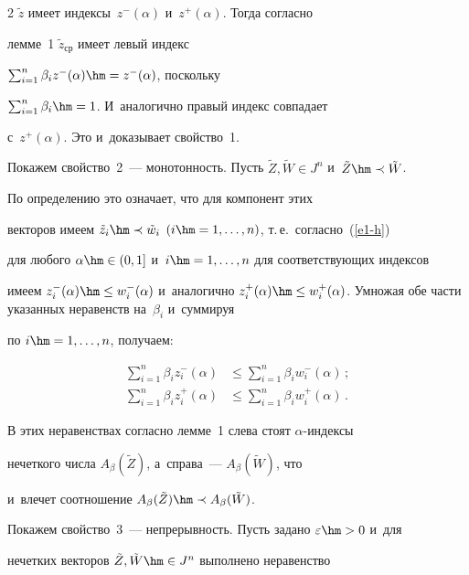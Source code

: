 \begin{multicols}{2}
$\tilde{z}$ имеет индексы~$z^{-}(\alpha)$ и~$z^{+}(\alpha)$. Тогда согласно 


лемме~1 $\tilde{z}_{\mathrm{ср}}$ имеет левый индекс 


$\sum\nolimits_{i=1}^n\beta_iz^{-}(\alpha) \hm= z^{-}(\alpha)$, поскольку 


$\sum\nolimits_{i=1}^n\beta_i\hm  = 1$. И~аналогично правый индекс совпадает 


с~$z^{+}(\alpha)$. Это и~доказывает свойство~1.





Покажем свойство~2~--- монотонность. Пусть $\tilde{Z}, \tilde{W}\in J^n$  и~$\tilde{Z}\hm\prec\tilde{W}$. 


По определению это означает, что для компонент этих 


векторов имеем $\tilde{z}_i\hm\prec\tilde{w}_i$ $(i\hm=1,\ldots,n)$, т.\,е.\ согласно~(\ref{e1-h}) 


для любого $\alpha\hm\in(0, 1]$ и~$i\hm=1,\ldots,n$ для соответствующих индексов 


имеем  $z^{-}_i(\alpha)\hm\leq w^{-}_i(\alpha)$ и~аналогично $z^{+}_i(\alpha)\hm\leq 


w^{+}_i(\alpha)$. Умножая обе части указанных неравенств на~$\beta_i$ и~суммируя 


по $i\hm=1,\ldots,n$, получаем:


\begin{align*}


\sum\limits_{i=1}^n\beta_iz^{-}_i(\alpha)&\leq\sum\limits_{i=1}^n\beta_iw^{-}_i(\alpha)\,;\\ 


\sum\limits_{i=1}^n\beta_iz^{+}_i(\alpha)&\leq\sum\limits_{i=1}^n\beta_iw^{+}_i(\alpha)\,.


\end{align*}


 В этих неравенствах согласно лемме~1 слева стоят $\alpha$-ин\-дек\-сы 


нечеткого чис\-ла $A_{\beta}(\tilde{Z})$, а~справа~---  $A_{\beta}(\tilde{W})$, что 


и~влечет соотношение $A_{\beta}(\tilde{Z})\hm\prec A_{\beta}(\tilde{W})$.





Покажем свойство~3~--- непрерывность. Пусть задано $\varepsilon\hm>0$ и~для 


нечетких векторов $ \tilde{Z}, \tilde{W}\hm\in J^n$ выполнено неравенство 



\end{multicols}
